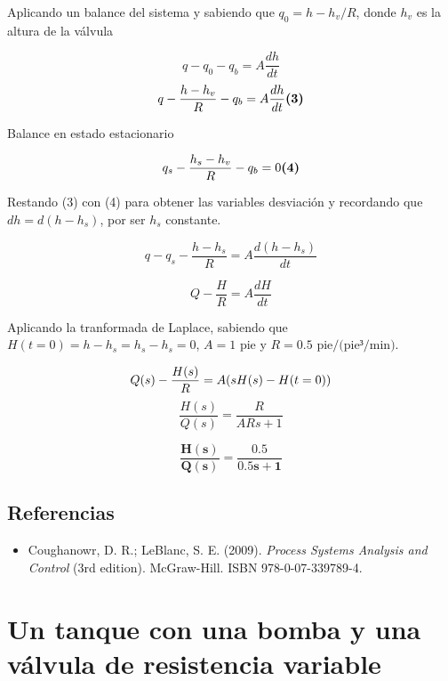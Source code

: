 \documentclass[
  letterpaper,
  DIV=11,
  numbers=noendperiod]{scrreprt}
\providecommand{\tightlist}{%
  \setlength{\itemsep}{0pt}\setlength{\parskip}{0pt}}\usepackage{longtable,booktabs,array}
\begin{document}
Aplicando un balance del sistema y sabiendo que \(q_0 = h-h_v/R\), donde
\(h_v\) es la altura de la válvula

\[
q - q_0- q_b = A\frac{dh}{dt}
\] \[
q - \frac{h-h_v}{R}- q_b = A\frac{dh}{dt} \space\space\space\space\space \textbf{(3)}
\]

Balance en estado estacionario

\[
q_s - \frac{h_s-h_v}{R}- q_b = 0 \space\space\space\space\space \textbf{(4)}
\]

Restando (3) con (4) para obtener las variables desviación y recordando
que \(dh=d(h-h_s)\), por ser \(h_s\) constante.

\[
q - q_s- \frac{h-h_s}{R} = A\frac{d(h-h_s)}{dt}
\]

\[
Q -\frac{H}{R} = A\frac{dH}{dt}
\]

Aplicando la tranformada de Laplace, sabiendo que
\(H(t=0)= h-h_s=h_s-h_s=0\), \(A=1\text{ pie}\) y
\(R=0.5\text{ pie/(pie³/min)}\).

\[
Q(s) -\frac{H(s)}{R} = A(sH(s)-H(t=0))\\
\] \[
\frac{H(s)}{Q(s)}  = \frac{R}{ARs+1}
\]

\[
\mathbf{\frac{H(s)}{Q(s)}  = \frac{0.5}{0.5s+1}}
\]

\hypertarget{referencias-1}{%
\section{Referencias}\label{referencias-1}}

\begin{itemize}
\tightlist
\item
  Coughanowr, D. R.; LeBlanc, S. E. (2009). \emph{Process Systems
  Analysis and Control} (3rd edition). McGraw-Hill. ISBN
  978-0-07-339789-4.
\end{itemize}

\hypertarget{un-tanque-con-una-bomba-y-una-vuxe1lvula-de-resistencia-variable}{%
\chapter{Un tanque con una bomba y una válvula de resistencia
variable}\label{un-tanque-con-una-bomba-y-una-vuxe1lvula-de-resistencia-variable}}
\end{document}
